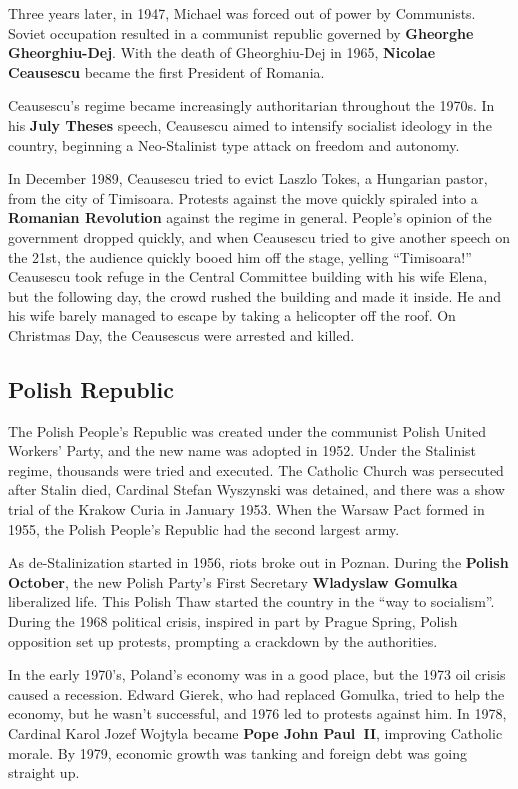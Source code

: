 Three years later, in 1947, Michael was forced out of power by Communists.
Soviet occupation resulted in a communist republic governed by \textbf{Gheorghe Gheorghiu-Dej}.
With the death of Gheorghiu-Dej in 1965,
\textbf{Nicolae Ceausescu} became the first President of Romania.

Ceausescu's regime became increasingly authoritarian throughout the 1970s.
In his \textbf{July Theses} speech, Ceausescu aimed to intensify socialist ideology in the country,
beginning a Neo-Stalinist type attack on freedom and autonomy.

In December 1989,
Ceausescu tried to evict Laszlo Tokes, a Hungarian pastor, from the city of Timisoara.
Protests against the move quickly spiraled into a
\textbf{Romanian Revolution} against the regime in general.
People's opinion of the government dropped quickly,
and when Ceausescu tried to give another speech on the 21st,
the audience quickly booed him off the stage, yelling ``Timisoara!''
Ceausescu took refuge in the Central Committee building with his wife Elena,
but the following day, the crowd rushed the building and made it inside.
He and his wife barely managed to escape by taking a helicopter off the roof.
On Christmas Day, the Ceausescus were arrested and killed.

\subsection*{Polish Republic}

The Polish People's Republic was created under the communist Polish United Workers' Party,
and the new name was adopted in 1952.
Under the Stalinist regime, thousands were tried and executed.
The Catholic Church was persecuted after Stalin died,
Cardinal Stefan Wyszynski was detained,
and there was a show trial of the Krakow Curia in January 1953.
When the Warsaw Pact formed in 1955, the Polish People's Republic had the second largest army.

As de-Stalinization started in 1956, riots broke out in Poznan.
During the \textbf{Polish October},
the new Polish Party's First Secretary \textbf{Wladyslaw Gomulka} liberalized life.
This Polish Thaw started the country in the ``way to socialism''.
During the 1968 political crisis, inspired in part by Prague Spring,
Polish opposition set up protests, prompting a crackdown by the authorities.

In the early 1970's,
Poland's economy was in a good place, but the 1973 oil crisis caused a recession.
Edward Gierek, who had replaced Gomulka, tried to help the economy, but he wasn't successful,
and 1976 led to protests against him.
In 1978, Cardinal Karol Jozef Wojtyla became \textbf{Pope John Paul~II}, improving Catholic morale.
By 1979, economic growth was tanking and foreign debt was going straight up.

